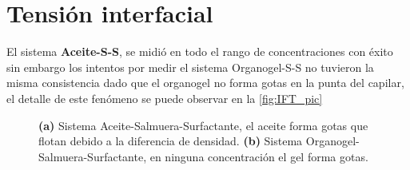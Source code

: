 

\section{Tensión interfacial}

El sistema \textbf{Aceite-S-S}, se midió en todo el rango de concentraciones con éxito sin embargo los intentos por medir el sistema Organogel-S-S no tuvieron la misma consistencia dado que el organogel no forma gotas en la punta del capilar, el detalle de este fenómeno se puede observar en la \autoref{fig:IFT_pic}

\begin{figure}\centering
     \quad
    \caption[Fotorgrafías gotas]{\textbf{(a)} Sistema Aceite-Salmuera-Surfactante, el aceite forma gotas que flotan debido a la diferencia de densidad. \textbf{(b)} Sistema Organogel-Salmuera-Surfactante, en ninguna concentración el gel forma gotas.}
    \label{fig:IFT_pic}
\end{figure}


